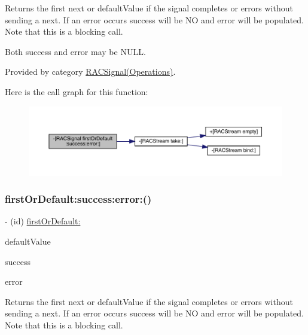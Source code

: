 Returns the first {\ttfamily next} or {\ttfamily default\+Value} if the signal completes or errors without sending a {\ttfamily next}. If an error occurs success will be NO and error will be populated. Note that this is a blocking call.

Both success and error may be N\+U\+LL. 

Provided by category \mbox{\hyperlink{category_r_a_c_signal_07_operations_08_a12b765a16842e9c7aa1d13b00d8df09b}{R\+A\+C\+Signal(\+Operations)}}.

Here is the call graph for this function\+:\nopagebreak
\begin{figure}[H]
\begin{center}
\leavevmode
\includegraphics[width=350pt]{interface_r_a_c_signal_a12b765a16842e9c7aa1d13b00d8df09b_cgraph}
\end{center}
\end{figure}
\mbox{\label{interface_r_a_c_signal_a12b765a16842e9c7aa1d13b00d8df09b}} 
\subsubsection{\texorpdfstring{first\+Or\+Default\+:success\+:error\+:()}{firstOrDefault:success:error:()}\hspace{0.1cm}{\footnotesize\ttfamily [2/3]}}
{\footnotesize\ttfamily -\/ (id) \mbox{\hyperlink{category_r_a_c_signal_07_operations_08_a51f980781f2dc9e662278d7db7b0cd38}{first\+Or\+Default\+:}} \begin{DoxyParamCaption}\item[{(id)}]{default\+Value }\item[{success:(B\+O\+OL $\ast$)}]{success }\item[{error:(N\+S\+Error $\ast$$\ast$)}]{error }\end{DoxyParamCaption}}

Returns the first {\ttfamily next} or {\ttfamily default\+Value} if the signal completes or errors without sending a {\ttfamily next}. If an error occurs success will be NO and error will be populated. Note that this is a blocking call.


